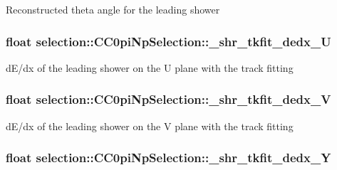 Reconstructed theta angle for the leading shower \hypertarget{classselection_1_1CC0piNpSelection_aaaef69409457695e2300bf847a13804c}{
\subsubsection[{\-\_\-shr\-\_\-tkfit\-\_\-dedx\-\_\-\-U}]{\setlength{\rightskip}{0pt plus 5cm}float selection\-::\-C\-C0pi\-Np\-Selection\-::\-\_\-shr\-\_\-tkfit\-\_\-dedx\-\_\-\-U\hspace{0.3cm}{\ttfamily [private]}}}\label{classselection_1_1CC0piNpSelection_aaaef69409457695e2300bf847a13804c}
d\-E/dx of the leading shower on the U plane with the track fitting \hypertarget{classselection_1_1CC0piNpSelection_a428fc549513bea0e1ca92cf90c1148cd}{
\subsubsection[{\-\_\-shr\-\_\-tkfit\-\_\-dedx\-\_\-\-V}]{\setlength{\rightskip}{0pt plus 5cm}float selection\-::\-C\-C0pi\-Np\-Selection\-::\-\_\-shr\-\_\-tkfit\-\_\-dedx\-\_\-\-V\hspace{0.3cm}{\ttfamily [private]}}}\label{classselection_1_1CC0piNpSelection_a428fc549513bea0e1ca92cf90c1148cd}
d\-E/dx of the leading shower on the V plane with the track fitting \hypertarget{classselection_1_1CC0piNpSelection_ababbbc32babdef645c2edc613713ceb7}{
\subsubsection[{\-\_\-shr\-\_\-tkfit\-\_\-dedx\-\_\-\-Y}]{\setlength{\rightskip}{0pt plus 5cm}float selection\-::\-C\-C0pi\-Np\-Selection\-::\-\_\-shr\-\_\-tkfit\-\_\-dedx\-\_\-\-Y\hspace{0.3cm}{\ttfamily [private]}}}\label{classselection_1_1CC0piNpSelection_ababbbc32babdef645c2edc613713ceb7}
